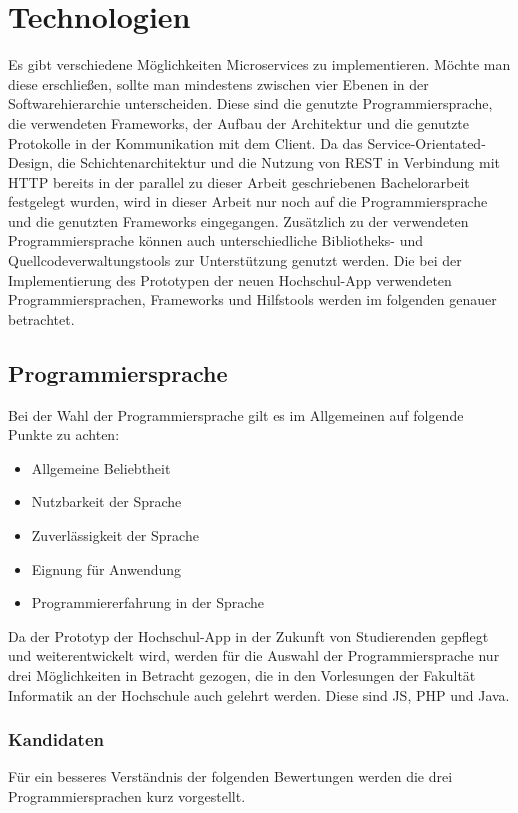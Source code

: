 \chapter{Technologien}
\label{sec:technologien}

Es gibt verschiedene Möglichkeiten Microservices zu implementieren. Möchte man diese erschließen, sollte man mindestens zwischen vier Ebenen in der Softwarehierarchie unterscheiden. Diese sind die genutzte Programmiersprache, die verwendeten Frameworks, der Aufbau der Architektur und die genutzte Protokolle in der Kommunikation mit dem Client. Da das Service-Orientated-Design, die Schichtenarchitektur und die Nutzung von \ac{REST} in Verbindung mit \ac{HTTP} bereits in der parallel zu dieser Arbeit geschriebenen Bachelorarbeit festgelegt wurden, wird in dieser Arbeit nur noch auf die Programmiersprache und die genutzten Frameworks eingegangen\autocite[Siehe][]{dnba}.  Zusätzlich zu der verwendeten Programmiersprache können auch unterschiedliche Bibliotheks- und Quellcodeverwaltungstools zur Unterstützung genutzt werden. Die bei der Implementierung des Prototypen der neuen Hochschul-\ac{App} verwendeten Programmiersprachen, Frameworks und Hilfstools werden im folgenden genauer betrachtet.

\section{Programmiersprache}
\label{sec:programmiersprache}
Bei der Wahl der Programmiersprache gilt es im Allgemeinen auf folgende Punkte zu achten:

\begin{itemize}
\item Allgemeine Beliebtheit
\item Nutzbarkeit der Sprache
\item Zuverlässigkeit der Sprache
\item Eignung für Anwendung
\item Programmiererfahrung in der Sprache
\end{itemize}

Da der Prototyp der Hochschul-\ac{App} in der Zukunft von Studierenden gepflegt und weiterentwickelt wird, werden für die Auswahl der Programmiersprache nur drei Möglichkeiten in Betracht gezogen, die in den Vorlesungen der Fakultät Informatik an der Hochschule auch gelehrt werden. Diese sind \ac{JS}, \ac{PHP} und Java.

\subsection*{Kandidaten}
Für ein besseres Verständnis der folgenden Bewertungen werden die drei Programmiersprachen kurz vorgestellt.

